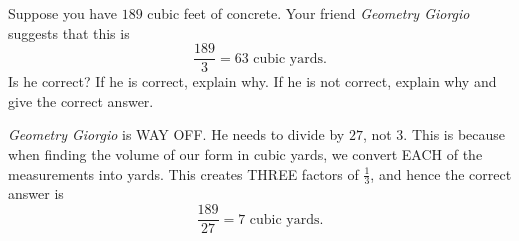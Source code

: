 \documentclass[handout,nooutcomes,noauthor,12pt]{ximera}
\begin{document}
\begin{question}
  Suppose you have $189$ cubic feet of concrete. Your friend \textit{Geometry
    Giorgio} suggests that this is
  \[
  \frac{189}{3} = 63 \text{ cubic yards}.
  \]
  Is he correct? If he is correct, explain why. If he is not correct,
  explain why and give the correct answer.
  \begin{freeResponse}
     \textit{Geometry Giorgio} is WAY OFF. He needs to divide by $27$,
     not $3$. This is because when finding the volume of our form in
     cubic yards, we convert EACH of the measurements into yards. This
     creates THREE factors of $\frac{1}{3}$, and hence the correct
     answer is
     \[
     \frac{189}{27} = 7 \text{ cubic yards}.
     \]
  \end{freeResponse}
\end{question}
\mynewpage
\end{document}
